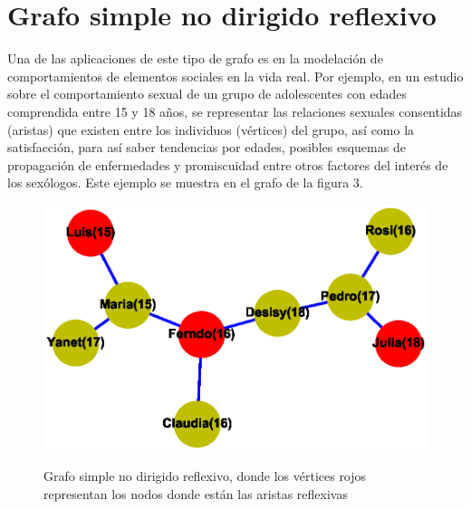 \documentclass{article}
\begin{document}
\section{Grafo simple no dirigido reflexivo}
Una de las aplicaciones de este tipo de grafo es en la modelación de comportamientos de elementos sociales en la vida real.
Por ejemplo, en un estudio sobre el comportamiento sexual de un grupo de adolescentes con edades comprendida entre 15 y 18 años, se representar las relaciones sexuales consentidas (aristas) que existen entre los individuos (vértices) del grupo, así como la satisfacción, para así saber tendencias por edades, posibles esquemas de propagación de enfermedades y promiscuidad entre otros factores del interés de los sexólogos. Este ejemplo se muestra en el grafo de la figura 3.  
  
\begin{center}

\end{center}
\begin{figure}[h]
\begin{center}
\includegraphics[scale=0.7]{Graf3.eps}\\
\caption{Grafo simple no dirigido reflexivo, donde los vértices rojos representan los nodos donde están las aristas reflexivas}
\end{center}
\end{figure}
\end{document}

